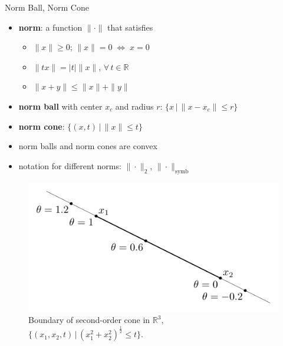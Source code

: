 \documentclass[10pt]{beamer}
\newcommand{\ds}{\displaystyle}
\newcommand{\ifff}{\;\Longleftrightarrow\;}
\theoremstyle{definition}
\begin{document}
\begin{frame}{Norm Ball, Norm Cone}
  \begin{itemize}
    \item {\bf norm}: a function $\|\cdot\|$ that satisfies 
      \begin{itemize}
        \item $\|x\|\geqslant 0$; $\|x\| = 0\ifff x = 0$
        \item $\|tx\| = |t|\|x\|$, $\forall\,t\in\mathbb{R}$
        \item $\|x + y\|\leqslant\|x\| + \|y\|$
      \end{itemize}
    \item {\bf norm ball} with center $x_c$ and radius $r$: $\ds\{x\,|\,\|x - x_c\|\leqslant r\}$
    \item {\bf norm cone}: $\ds\{(x, t)\,|\,\|x\|\leqslant t\}$
    \item norm balls and norm cones are convex
    \item notation for different norms: $\|\cdot\|_2$, $\|\cdot\|_{\text{symb}}$
  \end{itemize}
  \begin{figure}[!htbp]
    \centering
    \includegraphics[scale=0.55,page=10]{fig/note06/02.pdf}
    \caption{Boundary of second-order cone in $\mathbb{R}^3$, $\{(x_1, x_2, t)\,|\,(x_1^2 + x_2^2)^{\frac{1}{2}}\leqslant t\}$. }
  \end{figure}
\end{frame}
\end{document}
